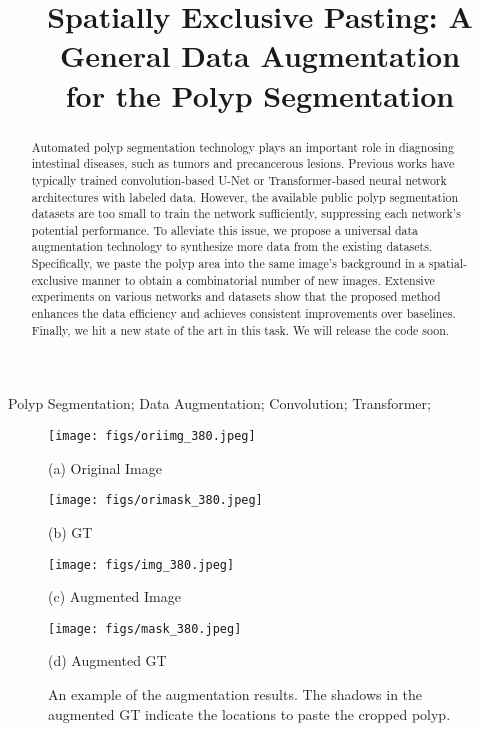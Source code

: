 \documentclass{article}
\title{Spatially Exclusive Pasting: A General Data Augmentation \\ for the Polyp Segmentation}
\begin{document}
\maketitle

\begin{abstract}
    
    Automated polyp segmentation technology plays an important role in diagnosing intestinal diseases, such as tumors and precancerous lesions. Previous works have typically trained convolution-based U-Net or Transformer-based neural network architectures with labeled data. However, the available public polyp segmentation datasets are too small to train the network sufficiently, suppressing each network's potential performance. To alleviate this issue, we propose a universal data augmentation technology to synthesize more data from the existing datasets. Specifically, we paste the polyp area into the same image’s background in a spatial-exclusive manner to obtain a combinatorial number of new images. Extensive experiments on various networks and datasets show that the proposed method enhances the data efficiency and achieves consistent improvements over baselines. Finally, we hit a new state of the art in this task. We will release the code soon.

\end{abstract}

\begin{keywords}
Polyp Segmentation; Data Augmentation; Convolution; Transformer;
\end{keywords}

\begin{figure}[t]
\begin{minipage}[b]{0.45\linewidth}
  \centering
  \centerline{\texttt{[image: figs/oriimg\_380.jpeg]}}
\centerline{(a) Original Image}\medskip
\end{minipage}
\begin{minipage}[b]{0.45\linewidth}
  \centering
  \centerline{\texttt{[image: figs/orimask\_380.jpeg]}}
\centerline{(b) GT}\medskip
\end{minipage}
\begin{minipage}[b]{0.45\linewidth}
  \centering
  \centerline{\texttt{[image: figs/img\_380.jpeg]}}
  \label{fig:augimg}
\centerline{(c) Augmented Image}\medskip
\end{minipage}
\begin{minipage}[b]{0.62\linewidth}
  \centering
  \centerline{\texttt{[image: figs/mask\_380.jpeg]}}
\centerline{(d) Augmented GT}\medskip
\end{minipage}
\hfill
\vspace{-0.5cm}
\caption{An example of the augmentation results. The shadows in the augmented GT indicate the locations to paste the cropped polyp.}
\label{fig:res}
\end{figure}
\end{document}
